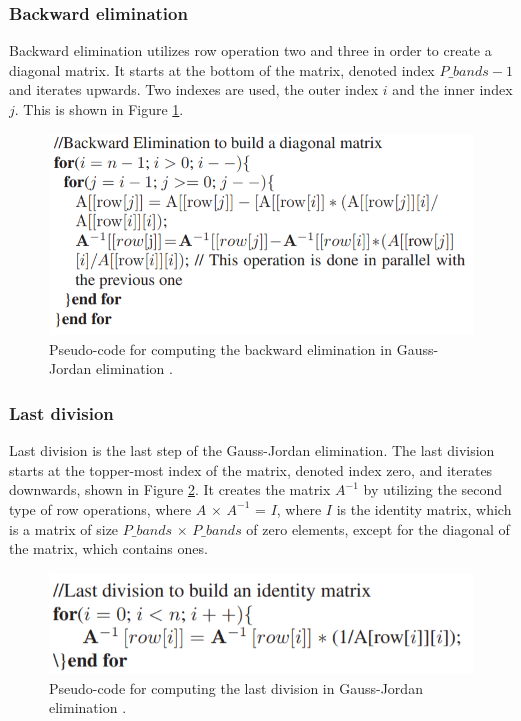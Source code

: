 \subsubsection{Backward elimination}
Backward elimination utilizes row operation two and three in order to create a diagonal matrix. It starts at the bottom of the matrix, denoted index $P\_bands-1$ and iterates upwards. Two indexes are used, the outer index $i$ and the inner index $j$. This is shown in Figure \ref{fig:backward_elimination_pseudocode}.

\begin{figure}[H]
\centering
   \includegraphics[scale=0.5]{images/backward_elimination_pseudocode.png}
  \caption{ Pseudo-code for computing the backward elimination in Gauss-Jordan elimination \cite{gauss_jordan_fpga}. } 
  \label{fig:backward_elimination_pseudocode}
\end{figure}


\subsubsection{Last division}
Last division is the last step of the Gauss-Jordan elimination. The last division starts at the topper-most index of the matrix, denoted index zero, and iterates downwards, shown in Figure \ref{fig:last_division_pseudocode}. It creates the matrix $A^{-1}$ by utilizing the second type of row operations, where $A$ $\times$ $A^{-1}$ = $I$, where $I$ is the identity matrix, which is a matrix of size $P\_bands$ $\times$ $P\_bands$ of zero elements, except for the diagonal of the matrix, which contains ones. 
\begin{figure}[H]
\centering
   \includegraphics[scale=0.5]{images/last_division_pseudocode.png}
  \caption{ Pseudo-code for computing the last division in Gauss-Jordan elimination \cite{gauss_jordan_fpga}. } 
  \label{fig:last_division_pseudocode}
\end{figure}

